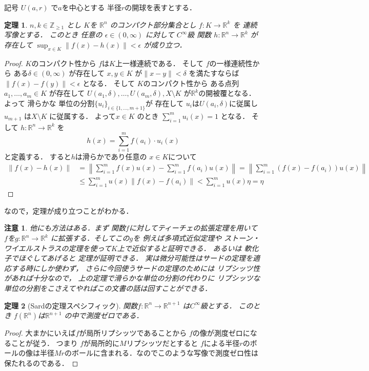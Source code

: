 \documentclass[leqno, a4paper, 12pt]{jsarticle}
\newtheorem{thm}{定理}
\newtheorem*{rmk}{注意}
\newcommand{\zz}{\mathbb{Z}}
\newcommand{\rr}{\mathbb{R}}
\begin{document}
記号
$U(a, r)$
で$a$を中心とする
半径$r$の開球を表すとする．
\begin{thm}\label{thm:26kinji}
$n, k\in \zz_{\ge 1}$
とし
$K$を
$\rr^{n}$
のコンパクト部分集合とし
$f\colon K\to \rr^{k}$
を
連続写像とする．
このとき
任意の
$\epsilon\in (0, \infty)$
に対して
$C^{\infty}$級
関数
$h\colon \rr^{n}\to \rr^{k}$
が存在して
$\sup_{x\in K}\lVert f(x)-h(x)\rVert<\epsilon$
が成り立つ．
\end{thm}
\begin{proof}
$K$のコンパクト性から
$f$は$K$上一様連続である．
そして
$f$の一様連続性から
ある$\delta\in (0, \infty)$
が存在して
$x, y\in K$
が$\lVert x-y \rVert<\delta$
を満たすならば
$\lVert f(x)-f(y)\rVert<\epsilon$
となる．
そして
$K$のコンパクト性から
ある点列$a_{1}, \dots, a_{m}\in K$
が存在して
$U(a_{1}, \delta), \dots, U(a_{m}, \delta), X\setminus K$
が$\rr^{k}$の開被覆となる．
よって
滑らかな
単位の分割$\{u_{i}\}_{i\in \{1, \dots, m+1\}}$が
存在して
$u_{i}$は$U(a_{i}, \delta)$に従属し
$u_{m+1}$
は$X\setminus K$
に従属する．
よって$x\in K$
のとき
$\sum_{i=1}^{m}u_{i}(x)=1$
となる．
そして
$h\colon \rr^{n}\to \rr^{k}$
を
\[
h(x)=\sum_{i=1}^{m}f(a_{i})\cdot u_{i}(x)
\]
と定義する．
すると$h$は滑らかであり任意の
$x\in K$について
\begin{align*}
\lVert f(x)-h(x) \rVert
&=
\left\lVert \sum_{i=1}^{m}f(x)u(x)-\sum_{i=1}^{m}f(a_{i})u(x)
\right\rVert
=
\left\lVert \sum_{i=1}^{m}(f(x)-f(a_{i}))u(x)
\right\rVert\\
&\le 
\sum_{i=1}^{m}u(x)\left\lVert f(x)-f(a_{i})
\right\rVert
< \sum_{i=1}^{m}u(x)\eta=\eta
\end{align*}
\end{proof}
なので，定理が成り立つことがわかる．
\begin{rmk}
他にも方法はある．まず
関数$f$に対してティーチェの拡張定理を用いて
$f$を$g\colon \rr^{n}\to \rr^{k}$
に拡張する．そしてこの$g$を
例えば多項式近似定理や
ストーン・ワイエルストラスの定理を使って$K$上で近似すると証明できる．
あるいは
軟化子でほぐしてあげると
定理が証明できる．
実は微分可能性はサードの定理を適応する時にしか使わず，
さらに今回使うサードの定理のためには
リプシッツ性があれば十分なので，
上の定理で滑らかな単位の分割の代わりに
リプシッツな単位の分割をこさえてやればこの文書の話は回すことができる．
\end{rmk}


\begin{thm}[Sardの定理スペシフィック]\label{thm:26sard}
関数$f\colon \rr^{n}\to \rr^{n+1}$
は$C^{\infty}$級とする．
このとき
$f(\rr^{n})$は$\rr^{n+1}$
の中で測度ゼロである．
\end{thm}
\begin{proof}
大まかにいえば$f$が局所リプシッツであることから
$f$の像が測度ゼロになることが従う．
つまり
$f$が局所的に$M$リプシッツだとすると
$f$による半径$r$のボールの像は半径$Mr$のボールに含まれる．なのでこのような写像で測度ゼロ性は保たれるのである．
\end{proof}
\end{document}
